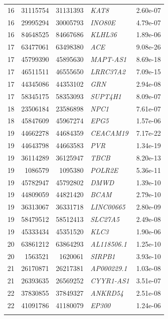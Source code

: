 \begin{longtable}{rrrlr}
   16 & 31115754 & 31131393 & \textit{KAT8} & 2.60e-07 \\ 
   16 & 29995294 & 30005793 & \textit{INO80E} & 4.79e-07 \\ 
   16 & 84648525 & 84667686 & \textit{KLHL36} & 1.89e-06 \\ 
   17 & 63477061 & 63498380 & \textit{ACE} & 9.08e-26 \\ 
   17 & 45799390 & 45895630 & \textit{MAPT-AS1} & 8.69e-18 \\ 
   17 & 46511511 & 46555650 & \textit{LRRC37A2} & 7.09e-15 \\ 
   17 & 44345086 & 44353102 & \textit{GRN} & 2.94e-08 \\ 
   17 & 58345175 & 58353093 & \textit{SUPT4H1} & 8.09e-07 \\ 
   18 & 23506184 & 23586898 & \textit{NPC1} & 7.61e-07 \\ 
   18 & 45847609 & 45967274 & \textit{EPG5} & 1.57e-06 \\ 
   19 & 44662278 & 44684359 & \textit{CEACAM19} & 7.17e-22 \\ 
   19 & 44643798 & 44663583 & \textit{PVR} & 1.34e-19 \\ 
   19 & 36114289 & 36125947 & \textit{TBCB} & 8.20e-13 \\ 
   19 & 1086579 & 1095380 & \textit{POLR2E} & 5.36e-11 \\ 
   19 & 45782947 & 45792802 & \textit{DMWD} & 1.39e-10 \\ 
   19 & 44809059 & 44821420 & \textit{BCAM} & 2.79e-10 \\ 
   19 & 36313067 & 36331718 & \textit{LINC00665} & 2.80e-09 \\ 
   19 & 58479512 & 58512413 & \textit{SLC27A5} & 2.49e-08 \\ 
   19 & 45333434 & 45351520 & \textit{KLC3} & 1.90e-06 \\ 
   20 & 63861212 & 63864293 & \textit{AL118506.1} & 1.25e-10 \\ 
   20 & 1563521 & 1620061 & \textit{SIRPB1} & 3.93e-10 \\ 
   21 & 26170871 & 26217381 & \textit{AP000229.1} & 1.03e-08 \\ 
   21 & 26393635 & 26569252 & \textit{CYYR1-AS1} & 3.51e-07 \\ 
   22 & 37830855 & 37849327 & \textit{ANKRD54} & 2.51e-08 \\ 
   22 & 41091786 & 41180079 & \textit{EP300} & 1.24e-06 \\ 
   \bottomrule
\label{tab:cistrans-TWAS_riskgenes}
\end{longtable}
\pagebreak

